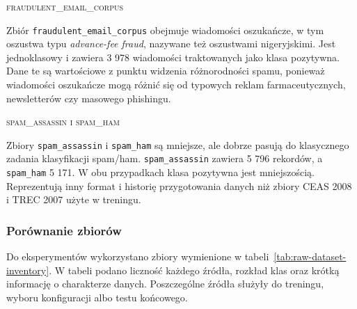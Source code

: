 \textsc{fraudulent\_email\_corpus}

Zbiór \texttt{fraudulent\_email\_corpus} obejmuje wiadomości oszukańcze, w
tym oszustwa typu \emph{advance-fee fraud}, nazywane też oszustwami nigeryjskimi.
Jest jednoklasowy i zawiera 3 978 wiadomości traktowanych jako klasa pozytywna.
Dane te są wartościowe z punktu widzenia różnorodności spamu,
ponieważ wiadomości oszukańcze mogą różnić się od typowych reklam
farmaceutycznych, newsletterów czy masowego phishingu.

\textsc{spam\_assassin i spam\_ham}

Zbiory \texttt{spam\_assassin} i \texttt{spam\_ham} są mniejsze, ale dobrze
pasują do klasycznego zadania klasyfikacji spam/ham. \texttt{spam\_assassin}
zawiera 5 796 rekordów, a \texttt{spam\_ham} 5 171. W obu przypadkach klasa
pozytywna jest mniejszością. Reprezentują inny format i historię przygotowania danych niż
zbiory CEAS 2008 i TREC 2007 użyte w treningu.

\subsubsection{Porównanie zbiorów}

Do eksperymentów wykorzystano zbiory wymienione w tabeli~\ref{tab:raw-dataset-inventory}.
W tabeli podano liczność każdego źródła, rozkład klas oraz krótką informację o
charakterze danych. Poszczególne źródła służyły do treningu, wyboru konfiguracji
albo testu końcowego.


